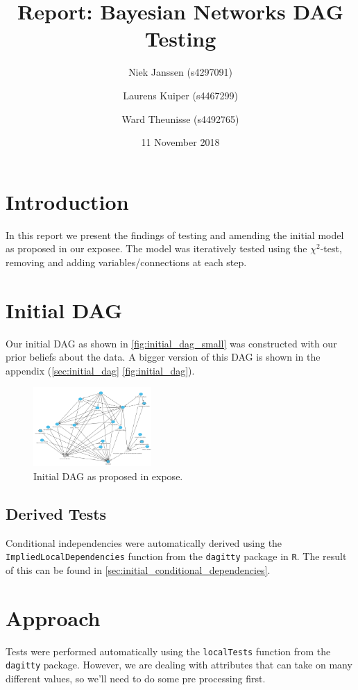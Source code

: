 \documentclass[11pt]{article}
\title{Report: Bayesian Networks DAG Testing}
\date{11 November 2018}
\author{Niek Janssen (s4297091)\and Laurens Kuiper (s4467299)\and Ward Theunisse (s4492765)}
\begin{document}
\maketitle
\thispagestyle{empty}
\begin{multicols}{2}
\section{Introduction}
In this report we present the findings of testing and amending the initial model
as proposed in our exposee.  The model was iteratively tested using the
$\chi^2$-test, removing and adding variables/connections at each step.

\section{Initial DAG}
Our initial DAG as shown in \autoref{fig:initial_dag_small} was constructed
with our prior beliefs about the data. A bigger version of this DAG is shown
in the appendix (\autoref{sec:initial_dag} \autoref{fig:initial_dag}). 

\begin{figure}[H]
	\centering
	\includegraphics[width=0.4\textwidth]{images/initial_dag}
	\caption{Initial DAG as proposed in expose.}
	\label{fig:initial_dag_small}
\end{figure}

\subsection{Derived Tests}
Conditional independencies were automatically derived using the
\texttt{ImpliedLocalDependencies} function from the \texttt{dagitty} package in
\texttt{R}. The result of this can be found in 
\autoref{sec:initial_conditional_dependencies}. 

\section{Approach}
Tests were performed automatically using the \texttt{localTests} function from
the \texttt{dagitty} package.  However, we are dealing with attributes that can
take on many different values, so we'll need to do some pre processing first.


\end{multicols}
\end{document}
